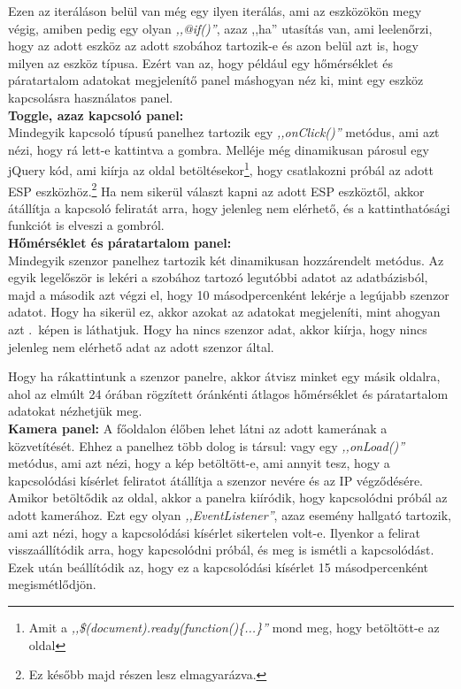 \documentclass[
]{thesis-ekf}
\theoremstyle{definition}
\theoremstyle{remark}
\begin{document}
	Ezen az iteráláson belül van még egy ilyen iterálás, ami az eszközökön megy végig, amiben pedig egy olyan \emph{,,@if()''}, azaz ,,ha'' utasítás van, ami leelenőrzi, hogy az adott eszköz az adott szobához tartozik-e és azon belül azt is, hogy milyen az eszköz típusa. Ezért van az, hogy például egy hőmérséklet és páratartalom adatokat megjelenítő panel máshogyan néz ki, mint egy eszköz kapcsolásra használatos panel.
	\\
	\textbf{Toggle, azaz kapcsoló panel:}
	\\
	Mindegyik kapcsoló\cite{flowbite-toggle} típusú panelhez tartozik egy \emph{,,onClick()''} metódus, ami azt nézi, hogy rá lett-e kattintva a gombra. Melléje még dinamikusan párosul egy jQuery kód, ami kiírja az oldal betöltésekor\footnote{\label{document-ready}Amit a \emph{,,\$(document).ready(function()\{...\}''} mond meg, hogy betöltött-e az oldal}, hogy csatlakozni próbál az adott ESP eszközhöz.\footnote{Ez később majd  részen lesz elmagyarázva.} Ha nem sikerül választ kapni az adott ESP eszköztől, akkor átállítja a kapcsoló feliratát arra, hogy jelenleg nem elérhető, és a kattinthatósági funkciót is elveszi a gombról.
	\\
	\textbf{Hőmérséklet és páratartalom panel:}
	\\
	Mindegyik szenzor panelhez tartozik két dinamikusan hozzárendelt metódus. Az egyik legelőször is lekéri a szobához tartozó legutóbbi adatot az adatbázisból, majd a második azt végzi el, hogy 10 másodpercenként lekérje a legújabb szenzor adatot. Hogy ha sikerül ez, akkor azokat az adatokat megjeleníti, mint ahogyan azt .~képen is láthatjuk. Hogy ha nincs szenzor adat, akkor kiírja, hogy nincs jelenleg nem elérhető adat az adott szenzor által.
	
	Hogy ha rákattintunk a szenzor panelre, akkor átvisz minket egy másik oldalra, ahol az elmúlt 24 órában rögzített óránkénti átlagos hőmérséklet és páratartalom adatokat nézhetjük meg.
	\\
	\textbf{Kamera panel:}
	A főoldalon élőben lehet látni az adott kamerának a közvetítését. Ehhez a panelhez több dolog is társul: vagy egy \emph{,,onLoad()''} metódus, ami azt nézi, hogy a kép betöltött-e, ami annyit tesz, hogy a kapcsolódási kísérlet feliratot átállítja a szenzor nevére és az IP végződésére. Amikor betöltődik az oldal, akkor a panelra kiíródik, hogy kapcsolódni próbál az adott kamerához. Ezt egy olyan \emph{,,EventListener''}, azaz esemény hallgató tartozik, ami azt nézi, hogy a kapcsolódási kísérlet sikertelen volt-e. Ilyenkor a felirat visszaállítódik arra, hogy kapcsolódni próbál, és meg is ismétli a kapcsolódást. Ezek után beállítódik az, hogy ez a kapcsolódási kísérlet 15 másodpercenként megismétlődjön. 
	
\end{document}
